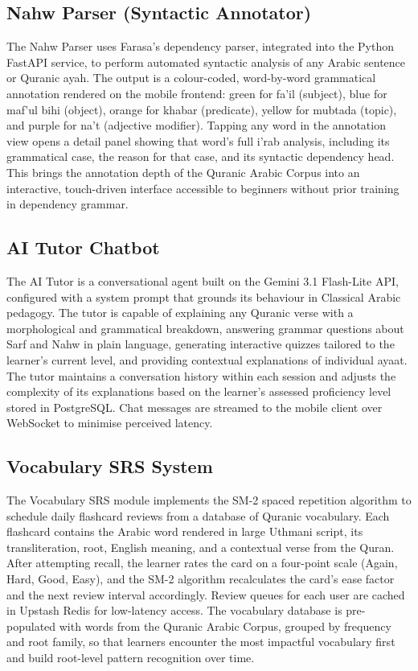 \documentclass[A4paper,12pt]{article}
\begin{document}
\subsection{Nahw Parser (Syntactic Annotator)}

The Nahw Parser uses Farasa's dependency parser, integrated into the Python FastAPI service, to
perform automated syntactic analysis of any Arabic sentence or Quranic ayah. The output is a
colour-coded, word-by-word grammatical annotation rendered on the mobile frontend: green for
fa'il (subject), blue for maf'ul bihi (object), orange for khabar (predicate), yellow for
mubtada (topic), and purple for na't (adjective modifier). Tapping any word in the annotation
view opens a detail panel showing that word's full i'rab analysis, including its grammatical
case, the reason for that case, and its syntactic dependency head. This brings the annotation
depth of the Quranic Arabic Corpus into an interactive, touch-driven interface accessible to
beginners without prior training in dependency grammar.

\subsection{AI Tutor Chatbot}

The AI Tutor is a conversational agent built on the Gemini 3.1 Flash-Lite API, configured with
a system prompt that grounds its behaviour in Classical Arabic pedagogy. The tutor is capable of
explaining any Quranic verse with a morphological and grammatical breakdown, answering grammar
questions about Sarf and Nahw in plain language, generating interactive quizzes tailored to the
learner's current level, and providing contextual explanations of individual ayaat. The tutor
maintains a conversation history within each session and adjusts the complexity of its
explanations based on the learner's assessed proficiency level stored in PostgreSQL. Chat
messages are streamed to the mobile client over WebSocket to minimise perceived latency.

\subsection{Vocabulary SRS System}

The Vocabulary SRS module implements the SM-2 spaced repetition algorithm to schedule daily
flashcard reviews from a database of Quranic vocabulary. Each flashcard contains the Arabic
word rendered in large Uthmani script, its transliteration, root, English meaning, and a
contextual verse from the Quran. After attempting recall, the learner rates the card on a
four-point scale (Again, Hard, Good, Easy), and the SM-2 algorithm recalculates the card's
ease factor and the next review interval accordingly. Review queues for each user are cached
in Upstash Redis for low-latency access. The vocabulary database is pre-populated with words
from the Quranic Arabic Corpus, grouped by frequency and root family, so that learners
encounter the most impactful vocabulary first and build root-level pattern recognition
over time.
\end{document}
